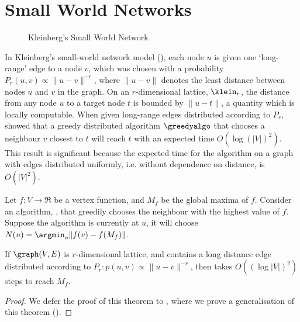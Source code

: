 \section{Small World Networks}
\label{sec:background:sw}

\begin{figure}[ht]
  \centering
  
  \caption{Kleinberg's Small World Network}
  \label{fig:kleinberg-sw}
\end{figure}

In Kleinberg's small-world network model (),
each node $u$ is given one `long-range' edge to a node $v$, which was
chosen with a probability $P_r(u,v) \propto \|u-v\|^{-r}$, where
$\|u-v\|$ denotes the least distance between nodes $u$ and $v$ in the
graph. On an $r$-dimensional lattice, $\klein_r$, the distance from
any node $u$ to a target node $t$ is bounded by $\|u-t\|$, a quantity
which is locally computable. When given long-range edges distributed
according to $P_r$, \citet{Kleinberg2000} showed that a greedy
distributed algorithm $\greedyalgo$ that chooses a neighbour $v$
closest to $t$ will reach $t$ with an expected time $O(\log(|V|)^2)$.
This result is significant because the expected time for the algorithm
on a graph with edges distributed uniformly, i.e. without dependence
on distance, is $O(|V|^2)$.

\begin{theorem}
  \label{thm:kleinberg-sw}
  Let $f: V \to \Re$ be a vertex function, and $M_f$ be the global
  maxima of $f$. Consider an algorithm, \greedyalgo, that greedily
  chooses the neighbour with the highest value of $f$. Suppose the
  algorithm is currently at $u$, it will choose $N(u) = \argmin_v \|f(v)
  - f(M_f)\|$.
  
  If $\graph(V,E)$ is $r$-dimensional lattice, and contains a long
  distance edge distributed according to $P_r: p(u,v) \propto
  \|u-v\|^{-r}$, then \greedyalgo takes $O( (\log |V|)^2 )$ steps to
  reach $M_f$.
\end{theorem}
\begin{proof}
  We defer the proof of this theorem to , where we
  prove a generalisation of this theorem ().
\end{proof}

